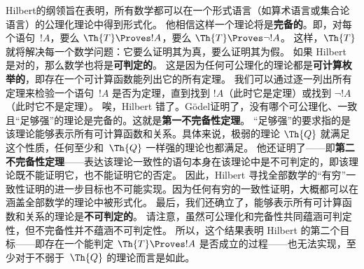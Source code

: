 Hilbert的纲领旨在表明，所有数学都可以在一个形式语言（如算术语言或集合论语言）的公理化理论中得到形式化。
他相信这样一个理论将是\textbf{完备的}。即，对每个语句~$!A$，要么 $\Th{T} \Proves !A$，要么 $\Th{T} \Proves \lnot !A$。
这样，$\Th{T}$ 就将解决每一个数学问题：它要么证明其为真，要么证明其为假。
如果 Hilbert 是对的，那么数学也将是\textbf{可判定的}。
这是因为任何可公理化的理论都是\textbf{可计算枚举的}，即存在一个可计算函数能列出它的所有定理。
我们可以通过逐一列出所有定理来检验一个语句~$!A$ 是否为定理，直到找到 $!A$（此时它是定理）或找到 $\lnot !A$（此时它不是定理）。
唉，Hilbert 错了。Gödel证明了，没有哪个可公理化、一致且“足够强”的理论是完备的。这就是\textbf{第一不完备性定理}。
“足够强”的要求指的是该理论能够表示所有可计算函数和关系。具体来说，极弱的理论 $\Th{Q}$ 就满足这个性质，任何至少和~$\Th{Q}$ 一样强的理论也都满足。
他还证明了——即\textbf{第二不完备性定理}——表达该理论一致性的语句本身在该理论中是不可判定的，即该理论既不能证明它，也不能证明它的否定。
因此，Hilbert 寻找全部数学的“有穷”一致性证明的进一步目标也不可能实现。因为任何有穷的一致性证明，大概都可以在涵盖全部数学的理论中被形式化。
最后，我们还确立了，能够表示所有可计算函数和关系的理论是\textbf{不可判定的}。
请注意，虽然可公理化和完备性共同蕴涵可判定性，但不完备性并不蕴涵不可判定性。
所以，这个结果表明 Hilbert 的第二个目标——即存在一个能判定 $\Th{T} \Proves !A$ 是否成立的过程——也无法实现，至少对于不弱于~$\Th{Q}$ 的理论而言是如此。